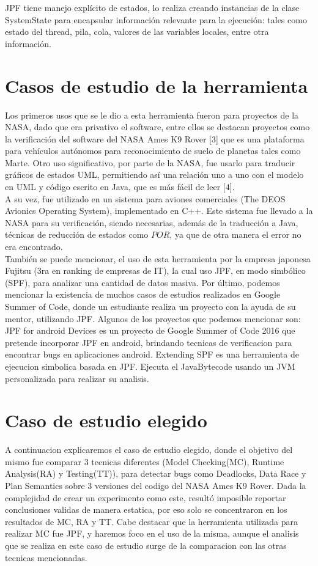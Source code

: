 \documentclass[runningheads]{llncs}
\begin{document}
JPF tiene manejo explícito de estados, lo realiza creando instancias de la clase SystemState para encapsular información relevante para la ejecución: tales como estado del thread, pila, cola, valores de las variables locales, entre otra información.


\section{Casos de estudio de la herramienta}

Los primeros usos que se le dio a esta herramienta fueron para proyectos de la NASA, dado que era privativo el software, entre ellos se destacan proyectos como la verificación del software del NASA Ames K9 Rover [3] que es una plataforma para vehículos autónomos para reconocimiento de suelo de planetas tales como Marte.
Otro uso significativo, por parte de la NASA, fue usarlo para traducir gráficos de estados UML, permitiendo así una relación uno a uno con el modelo en UML y código escrito en Java, que es más fácil de leer [4].\\
A su vez, fue utilizado en un sistema para aviones comerciales (The DEOS Avionics Operating System), implementado en C++. Este sistema fue llevado a la NASA para su verificación, siendo necesarias, además de la traducción a Java, t\'ecnicas de reducci\'on de estados como $POR$, ya que de otra manera el error no era encontrado.\\
También se puede mencionar, el uso de esta herramienta por la empresa japonesa Fujitsu (3ra en ranking de empresas de IT), la cual uso JPF, en modo simbólico (SPF), para analizar una cantidad de datos masiva.
Por último, podemos mencionar la existencia de muchos casos de estudios realizados en Google Summer of Code, donde un estudiante realiza un proyecto con la ayuda de su mentor, utilizando JPF. Algunos de los proyectos que podemos mencionar son: 
JPF for android Devices es un proyecto de Google Summer of Code 2016 que pretende incorporar JPF en android, brindando tecnicas de verificacion para encontrar bugs en aplicaciones android.
Extending SPF es una herramienta de ejecucion simbolica basada en JPF. Ejecuta el JavaBytecode usando un JVM personalizada para realizar su analisis.


\section{Caso de estudio elegido}
A continuacion explicaremos el caso de estudio elegido, donde el objetivo del mismo fue comparar 3 tecnicas diferentes (Model Checking(MC), Runtime Analysis(RA) y Testing(TT)), para detectar bugs como Deadlocks, Data Race y Plan Semantics sobre 3 versiones del codigo del NASA Ames K9 Rover.
Dada la complejidad de crear un experimento como este, result\'o imposible reportar conclusiones validas de manera estatica, por eso solo se concentraron en los resultados de MC, RA y TT. Cabe destacar que la herramienta utilizada para realizar MC fue JPF, y haremos foco en el uso de la misma, aunque el analisis que se realiza en este caso de estudio surge de la comparacion con las otras tecnicas mencionadas.
\end{document}
